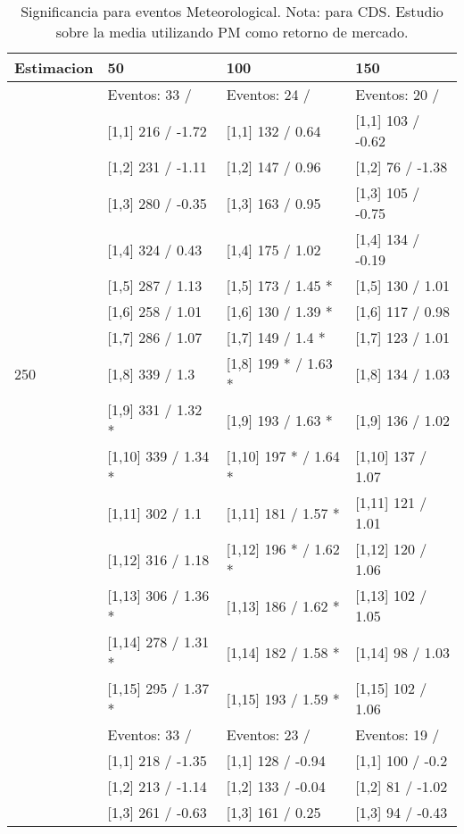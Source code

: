 \begin{table}

\caption{Significancia para eventos Meteorological. Nota: para CDS. Estudio sobre la media utilizando PM como retorno de mercado.}
\centering
\begin{tabular}[t]{llll}
\toprule
Estimacion & 50 & 100 & 150\\
\midrule
 & Eventos:  33 / & Eventos:  24 / & Eventos:  20 /\\
 & {}[1,1] 216  / -1.72 & {}[1,1] 132  / 0.64 & {}[1,1] 103  / -0.62\\
 & {}[1,2] 231  / -1.11 & {}[1,2] 147  / 0.96 & {}[1,2] 76  / -1.38\\
 & {}[1,3] 280  / -0.35 & {}[1,3] 163  / 0.95 & {}[1,3] 105  / -0.75\\
 & {}[1,4] 324  / 0.43 & {}[1,4] 175  / 1.02 & {}[1,4] 134  / -0.19\\
\addlinespace
 & {}[1,5] 287  / 1.13 & {}[1,5] 173  / 1.45 * & {}[1,5] 130  / 1.01\\
 & {}[1,6] 258  / 1.01 & {}[1,6] 130  / 1.39 * & {}[1,6] 117  / 0.98\\
 & {}[1,7] 286  / 1.07 & {}[1,7] 149  / 1.4 * & {}[1,7] 123  / 1.01\\
250 & {}[1,8] 339  / 1.3 & {}[1,8] 199 * / 1.63 * & {}[1,8] 134  / 1.03\\
 & {}[1,9] 331  / 1.32 * & {}[1,9] 193  / 1.63 * & {}[1,9] 136  / 1.02\\
\addlinespace
 & {}[1,10] 339  / 1.34 * & {}[1,10] 197 * / 1.64 * & {}[1,10] 137  / 1.07\\
 & {}[1,11] 302  / 1.1 & {}[1,11] 181  / 1.57 * & {}[1,11] 121  / 1.01\\
 & {}[1,12] 316  / 1.18 & {}[1,12] 196 * / 1.62 * & {}[1,12] 120  / 1.06\\
 & {}[1,13] 306  / 1.36 * & {}[1,13] 186  / 1.62 * & {}[1,13] 102  / 1.05\\
 & {}[1,14] 278  / 1.31 * & {}[1,14] 182  / 1.58 * & {}[1,14] 98  / 1.03\\
\addlinespace
 & {}[1,15] 295  / 1.37 * & {}[1,15] 193  / 1.59 * & {}[1,15] 102  / 1.06\\
 & Eventos:  33 / & Eventos:  23 / & Eventos:  19 /\\
 & {}[1,1] 218  / -1.35 & {}[1,1] 128  / -0.94 & {}[1,1] 100  / -0.2\\
 & {}[1,2] 213  / -1.14 & {}[1,2] 133  / -0.04 & {}[1,2] 81  / -1.02\\
 & {}[1,3] 261  / -0.63 & {}[1,3] 161  / 0.25 & {}[1,3] 94  / -0.43\\

\end{tabular}
\end{table}
